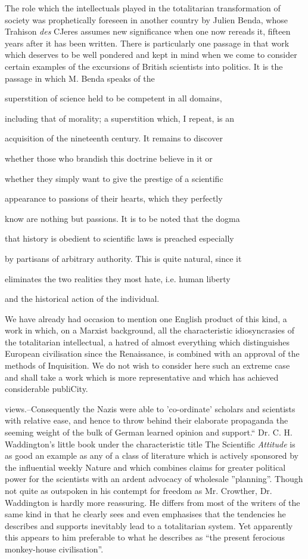 \documentclass[11pt,openany]{book}
\begin{document}
The role which the intellectuals played in the totalitarian transformation of society was prophetically foreseen in another country by Julien Benda, whose Trahison \emph{des} CJeres assumes new significance when one now rereads it, fifteen years after it has been written. There is particularly one passage in that work which deserves to be well pondered and kept in mind when we come to consider certain examples of the excursions of British scientists into politics. It is the passage in which M. Benda speaks of the

superstition of science held to be competent in all domains,

including that of morality; a superstition which, I repeat, is an

acquisition of the nineteenth century. It remains to discover

whether those who brandish this doctrine believe in it or

whether they simply want to give the prestige of a scientific

appearance to passions of their hearts, which they perfectly

know are nothing but passions. It is to be noted that the dogma

that history is obedient to scientific laws is preached especially

by partisans of arbitrary authority. This is quite natural, since it

eliminates the two realities they most hate, i.e. human liberty

and the historical action of the individual.

We have already had occasion to mention one English product of this kind, a work in which, on a Marxist background, all the characteristic idiosyncrasies of the totalitarian intellectual, a hatred of almost everything which distinguishes European civilisation since the Renaissance, is combined with an approval of the methods of Inquisition. We do not wish to consider here such an extreme case and shall take a work which is more representative and which has achieved considerable publiCity.

views.--Consequently the Nazis were able to 'co-ordinate' scholars and scientists with relative ease, and hence to throw behind their elaborate propaganda the seeming weight of the bulk of German learned opinion and support.`` Dr. C. H. Waddington's little book under the characteristic title The Scientific \emph{Attitude} is as good an example as any of a class of literature which is actively sponsored by the influential weekly Nature and which combines claims for greater political power for the scientists with an ardent advocacy of wholesale ''planning''. Though not quite as outspoken in his contempt for freedom as Mr. Crowther, Dr. Waddington is hardly more reassuring. He differs from most of the writers of the same kind in that he clearly sees and even emphasises that the tendencies he describes and supports inevitably lead to a totalitarian system. Yet apparently this appears to him preferable to what he describes as ``the present ferocious monkey-house civilisation''.
\end{document}

